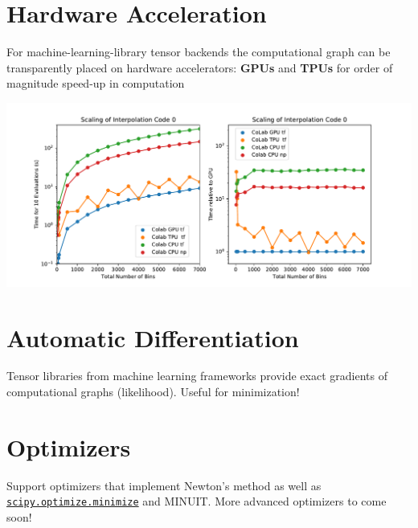 \documentclass[princeton,portrait]{a0poster}
\begin{document}
\begin{multicols}{2}
 \section*{\LARGE\color{MediumBlue} Hardware Acceleration}
 For machine-learning-library tensor backends the computational graph can be transparently placed on hardware accelerators: \textbf{GPUs} and \textbf{TPUs} for order of magnitude speed-up in computation
 \begin{center}
  \includegraphics[width=\linewidth]{scaling_hardware.pdf}
 \end{center}

 \section*{\LARGE\color{MediumBlue} Automatic Differentiation}

 Tensor libraries from machine learning frameworks provide exact gradients of computational graphs (likelihood). Useful for minimization!

 \section*{\LARGE\color{MediumBlue} Optimizers}

 Support optimizers that implement Newton's method as well as \href{https://docs.scipy.org/doc/scipy/reference/generated/scipy.optimize.minimize.html}{\texttt{scipy.optimize.minimize}} and MINUIT.
 More advanced optimizers to come soon!

 \vspace{1cm}


\end{multicols}
\end{document}
